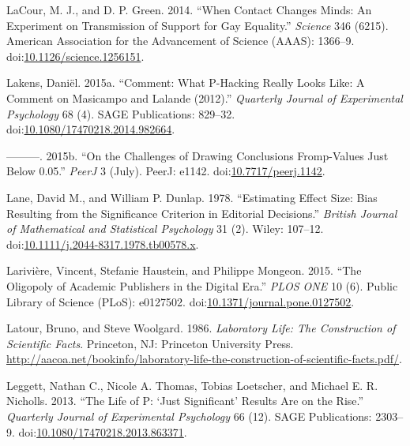 \documentclass[a5paper]{book}
\begin{document}
\hypertarget{ref-doi:10.1126ux2fscience.1256151}{}
LaCour, M. J., and D. P. Green. 2014. ``When Contact Changes Minds: An
Experiment on Transmission of Support for Gay Equality.'' \emph{Science}
346 (6215). American Association for the Advancement of Science (AAAS):
1366--9.
doi:\href{https://doi.org/10.1126/science.1256151}{10.1126/science.1256151}.

\hypertarget{ref-doi:10.1080ux2f17470218.2014.982664}{}
Lakens, Daniël. 2015a. ``Comment: What P-Hacking Really Looks Like: A
Comment on Masicampo and Lalande (2012).'' \emph{Quarterly Journal of
Experimental Psychology} 68 (4). SAGE Publications: 829--32.
doi:\href{https://doi.org/10.1080/17470218.2014.982664}{10.1080/17470218.2014.982664}.

\hypertarget{ref-doi:10.7717ux2fpeerj.1142}{}
---------. 2015b. ``On the Challenges of Drawing Conclusions
Fromp-Values Just Below 0.05.'' \emph{PeerJ} 3 (July). PeerJ: e1142.
doi:\href{https://doi.org/10.7717/peerj.1142}{10.7717/peerj.1142}.

\hypertarget{ref-doi:10.1111ux2fj.2044-8317.1978.tb00578.x}{}
Lane, David M., and William P. Dunlap. 1978. ``Estimating Effect Size:
Bias Resulting from the Significance Criterion in Editorial Decisions.''
\emph{British Journal of Mathematical and Statistical Psychology} 31
(2). Wiley: 107--12.
doi:\href{https://doi.org/10.1111/j.2044-8317.1978.tb00578.x}{10.1111/j.2044-8317.1978.tb00578.x}.

\hypertarget{ref-doi:10.1371ux2fjournal.pone.0127502}{}
Larivière, Vincent, Stefanie Haustein, and Philippe Mongeon. 2015. ``The
Oligopoly of Academic Publishers in the Digital Era.'' \emph{PLOS ONE}
10 (6). Public Library of Science (PLoS): e0127502.
doi:\href{https://doi.org/10.1371/journal.pone.0127502}{10.1371/journal.pone.0127502}.

\hypertarget{ref-isbn:0692094187}{}
Latour, Bruno, and Steve Woolgard. 1986. \emph{Laboratory Life: The
Construction of Scientific Facts}. Princeton, NJ: Princeton University
Press.
\url{http://aacoa.net/bookinfo/laboratory-life-the-construction-of-scientific-facts.pdf/}.

\hypertarget{ref-doi:10.1080ux2f17470218.2013.863371}{}
Leggett, Nathan C., Nicole A. Thomas, Tobias Loetscher, and Michael E.
R. Nicholls. 2013. ``The Life of P: `Just Significant' Results Are on
the Rise.'' \emph{Quarterly Journal of Experimental Psychology} 66 (12).
SAGE Publications: 2303--9.
doi:\href{https://doi.org/10.1080/17470218.2013.863371}{10.1080/17470218.2013.863371}.
\end{document}
